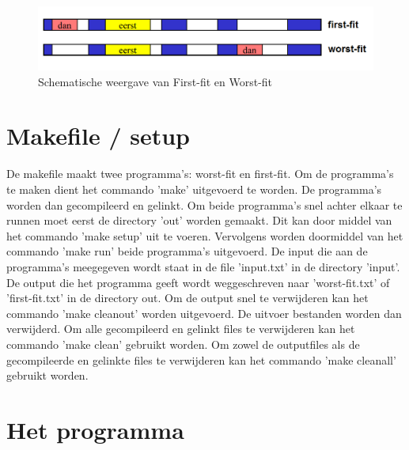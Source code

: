 \documentclass[a4paper]{article}
\begin{document}
	\begin{figure}[h]
		\begin{center}
		\includegraphics[width=1\textwidth]{geheugenbeheer.png}
		\caption{Schematische weergave van First-fit en Worst-fit}
		\end{center}
	\end{figure}

	\newpage

	\section{Makefile / setup}\label{sec:makefile}
	De makefile maakt twee programma's: worst-fit en first-fit. Om de programma's te maken dient het commando 'make' uitgevoerd te worden. De programma's worden dan gecompileerd en gelinkt. Om beide programma's snel achter elkaar te runnen moet eerst de directory 'out' worden gemaakt. Dit kan door middel van het commando 'make setup' uit te voeren. Vervolgens worden doormiddel van het commando 'make run' beide programma's uitgevoerd. De input die aan de programma's meegegeven wordt staat in de file 'input.txt' in de directory 'input'. De output die het programma geeft wordt weggeschreven naar 'worst-fit.txt' of 'first-fit.txt' in de directory out. Om de output snel te verwijderen kan het commando 'make cleanout' worden uitgevoerd. De uitvoer bestanden worden dan verwijderd. Om alle gecompileerd en gelinkt files te verwijderen kan het commando 'make clean' gebruikt worden. Om zowel de outputfiles als de gecompileerde en gelinkte files te verwijderen kan het commando 'make cleanall' gebruikt worden.

	\section{Het programma}\label{sec:programma}	
\end{document}
